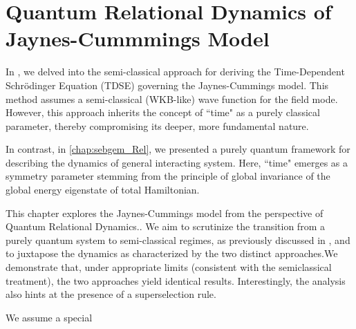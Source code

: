 \chapter{Quantum Relational Dynamics of Jaynes-Cummmings Model
\label{chap5:RDQ_JCM_chap}}

In , we delved into the semi-classical approach for 
deriving the Time-Dependent Schrödinger Equation (TDSE) governing the Jaynes-Cummings model. 
This method assumes a semi-classical (WKB-like) wave function for the field mode. However, 
this approach inherits the concept of ``time" as a purely classical parameter, thereby 
compromising its deeper, more fundamental nature.

In contrast, in \ref{chap:sebgem_Rel}, we presented a purely quantum framework for 
describing the dynamics of general interacting system. Here, ``time" 
emerges as a symmetry parameter stemming from the principle of global invariance of the global energy 
eigenstate of total Hamiltonian.

This chapter explores the Jaynes-Cummings model from the perspective of Quantum Relational Dynamics.. 
We aim to scrutinize the transition from a purely quantum system to semi-classical regimes, 
as previously discussed in , and to juxtapose the dynamics as 
characterized by the two distinct approaches.We demonstrate that, under appropriate limits 
(consistent with the semiclassical treatment), the two approaches yield identical results. 
Interestingly, the analysis also hints at the presence of a superselection rule.

We assume a special